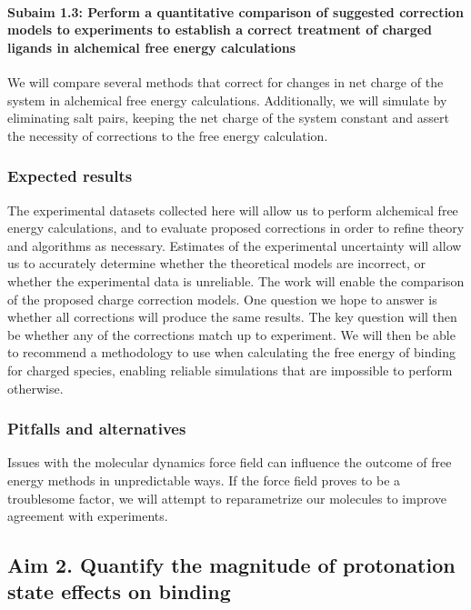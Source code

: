 \documentclass[10pt]{article}
\newcommand{\subsubsubsection}[1]{\paragraph*{#1}}
\begin{document}
\subsubsubsection{Subaim 1.3: Perform a quantitative comparison of suggested correction models to experiments to establish a correct treatment of charged ligands in alchemical free energy calculations}
We will compare several methods that correct for changes in net charge of the system in alchemical free energy calculations\cite{Reif2013a,Rocklin2013a}. Additionally, we will simulate by eliminating salt pairs, keeping the net charge of the system constant and assert the necessity of corrections to the free energy calculation.

\subsubsection*{Expected results}
The experimental datasets collected here will allow us to perform alchemical free energy calculations, and to evaluate proposed corrections in order to refine theory and algorithms as necessary. Estimates of the experimental uncertainty will allow us to accurately determine whether the theoretical models are incorrect, or whether the experimental data is unreliable.
The work will enable the comparison of the proposed charge correction models. One question we hope to answer is whether all corrections will produce the same results. The key question will then be whether any of the corrections  match up to experiment.
 We will then be able to recommend a methodology to use when calculating the free energy of binding for charged species, enabling reliable simulations that are impossible to perform otherwise.
\subsubsection*{Pitfalls and alternatives}



Issues with the molecular dynamics force field can influence the outcome of free energy methods in unpredictable ways. If the force field proves to be a troublesome factor, we will attempt to reparametrize our molecules to improve agreement with experiments.

\subsection*{Aim 2. Quantify the magnitude of protonation state effects on binding}
\end{document}

